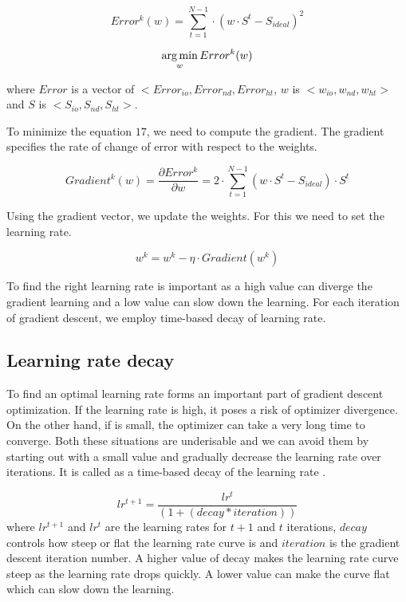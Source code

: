 \begin{equation}
Error^k(w) = \sum_{t=1}^{N-1} \cdot (w \cdot S^t - S_{ideal}) ^ 2
\end{equation}

\begin{equation}
\operatorname*{arg\,min}_w Error^k(w) 
\end{equation} 

where $Error$ is a vector of $<Error_{io}, Error_{nd}, Error_{ht}$,
$w$ is $<w_{io}, w_{nd}, w_{ht}>$ and $S$ is $<S_{io}, S_{nd}, S_{ht}>$.

To minimize the equation $17$, we need to compute the gradient. The gradient specifies the rate of change of error with respect to the weights.

\begin{equation}
Gradient^k(w) = \frac{\partial Error^k}{\partial w} = 2 \cdot \sum_{t=1}^{N-1} (w \cdot S^t - S_{ideal}) \cdot S^t
\end{equation}

Using the gradient vector, we update the weights. For this we need to set the learning rate.

\begin{equation}
w^k = w^k - \eta \cdot {Gradient(w^k)}
\end{equation}

To find the right learning rate is important as a high value can diverge the gradient learning and a low value can slow down the learning. For each iteration of gradient descent, we employ time-based decay of learning rate.


\subsection{Learning rate decay}
To find an optimal learning rate forms an important part of gradient descent optimization. If the learning rate is high, it poses a risk of optimizer divergence. On the other hand, if is small, the optimizer can take a very long time to converge. Both these situations are underisable and we can avoid them by starting out with a small value and gradually decrease the learning rate over iterations. It is called as a time-based decay of the learning rate \cite{articleRuderS}.

\begin{equation}
lr^{t+1} = \frac{lr^t}{( 1 + ( decay * iteration ) )}
\end{equation}
where $lr^{t+1}$ and $lr^t$ are the learning rates for $t+1$ and $t$ iterations,   $decay$ controls how steep or flat the learning rate curve is and $iteration$ is the gradient descent iteration number. A higher value of decay makes the learning rate curve steep as the learning rate drops quickly. A lower value can make the curve flat which can slow down the learning.

